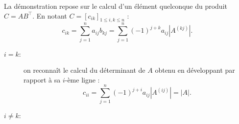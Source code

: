 \proof
La démonstration repose sur le calcul d'un élément quelconque du produit $C = A B^\top$. En notant $C = [c_{ik}]_{1 \leq i, k \leq n}$ : 
$$
c_{ik} 
= \sum_{j=1}^n a_{ij} b_{kj} 
= \sum_{j=1}^n (-1)^{j+k} a_{ij} |A^{(kj)}|.
$$
\begin{description}
  \item[$i = k$:] on reconnaît le calcul du déterminant de $A$ obtenu en développant par rapport à sa $i$-ème ligne : 
  $$
  c_{ii} 
  = \sum_{j=1}^n (-1)^{j+i} a_{ij} |A^{(ij)}|
  = |A|.
  $$
  \item[$i \neq k$:] 

\end{description}
